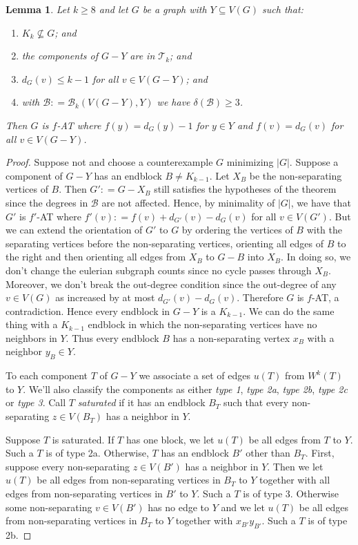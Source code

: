 \documentclass[12pt]{article}
\theoremstyle{plain}
\newtheorem{lem}[thm]{Lemma}
\theoremstyle{definition}
\theoremstyle{remark}
\newcommand{\fancy}[1]{\mathcal{#1}}
\newcommand{\T}{\fancy{T}}
\newcommand{\B}{\fancy{B}}
\newcommand{\card}[1]{\left|#1\right|}
\newcommand{\DefinedAs}{\mathrel{\mathop:}=}
\begin{document}
\begin{lem}\label{MultipleHighConfigurationEuler}
Let $k \geq 8$ and let $G$ be a graph with $Y \subseteq V(G)$ such that:
\begin{enumerate}
\item $K_k \not \subseteq G$; and
\item the components of $G-Y$ are in $\T_k$; and
\item $d_G(v) \leq k - 1$ for all $v \in V(G-Y)$; and
\item with $\B \DefinedAs \B_k(V(G-Y), Y)$ we have $\delta(\B) \geq 3$.
\end{enumerate}

\noindent Then $G$ is $f$-AT where $f(y) = d_G(y) - 1$ for $y \in Y$ and $f(v) = d_G(v)$ for all $v \in V(G - Y)$.
\end{lem}
\begin{proof}
Suppose not and choose a counterexample $G$ minimizing $\card{G}$.  Suppose a component of $G-Y$ has an endblock $B \neq K_{k-1}$.  Let $X_B$ be the non-separating vertices of $B$.  Then $G' \DefinedAs G-X_B$ still satisfies the hypotheses of the theorem since the degrees in $\B$ are not affected.  Hence, by minimality of $\card{G}$, we have that $G'$ is $f'$-AT where $f'(v) \DefinedAs f(v) + d_{G'}(v) - d_G(v)$ for all $v \in V(G')$.  But we can extend the orientation of $G'$ to $G$ by ordering the vertices of $B$ with the separating vertices before the non-separating vertices, orienting all edges of $B$ to the right and then orienting all edges from $X_B$ to $G-B$ into $X_B$. In doing so, we don't change the eulerian subgraph counts since no cycle passes through $X_B$. Moreover, we don't break the out-degree condition since the out-degree of any $v \in V(G)$ as increased by at most $d_{G'}(v) - d_G(v)$. Therefore $G$ is $f$-AT, a contradiction. Hence every endblock in $G-Y$ is a $K_{k-1}$.  We can do the same thing with a $K_{k-1}$ endblock in which the non-separating vertices have no neighbors in $Y$. Thus every endblock $B$ has a non-separating vertex $x_B$ with a neighbor $y_B \in Y$.

To each component $T$ of $G-Y$ we associate a set of edges $u(T)$ from $W^k(T)$ to $Y$. We'll also classify the components as either \emph{type 1}, \emph{type 2a}, \emph{type 2b}, \emph{type 2c} or \emph{type 3}. Call $T$ \emph{saturated} if it has an endblock $B_T$ such that every non-separating $z \in V(B_T)$ has a neighbor in $Y$.  

Suppose $T$ is saturated.  If $T$ has one block, we let $u(T)$ be all edges from $T$ to $Y$.  Such a $T$ is of type 2a.  Otherwise, $T$ has an endblock $B'$ other than $B_T$.  First, suppose  every non-separating $z \in V(B')$ has a neighbor in $Y$.  Then we let $u(T)$ be all edges from non-separating vertices in $B_T$ to $Y$ together with all edges from non-separating vertices in $B'$ to $Y$.  Such a $T$ is of type 3.  Otherwise some non-separating $v \in V(B')$ has no edge to $Y$ and we let $u(T)$ be all edges from non-separating vertices in $B_T$ to $Y$ together with $x_{B'}y_{B'}$.  Such a $T$ is of type 2b.


\end{proof}
\end{document}
